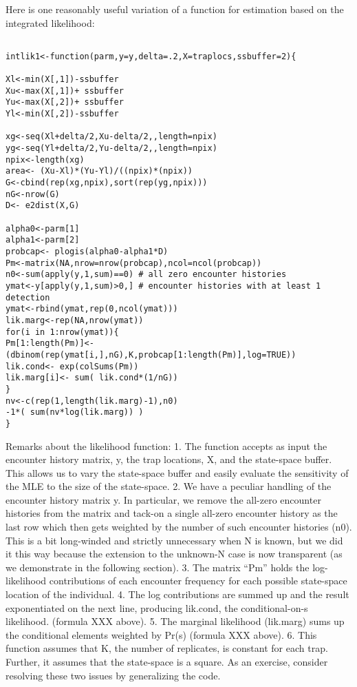 Here is one reasonably useful variation of a function for estimation
based on the integrated likelihood:

\begin{verbatim}

intlik1<-function(parm,y=y,delta=.2,X=traplocs,ssbuffer=2){

Xl<-min(X[,1])-ssbuffer 
Xu<-max(X[,1])+ ssbuffer
Yu<-max(X[,2])+ ssbuffer
Yl<-min(X[,2])-ssbuffer

xg<-seq(Xl+delta/2,Xu-delta/2,,length=npix) 
yg<-seq(Yl+delta/2,Yu-delta/2,,length=npix) 
npix<-length(xg)
area<- (Xu-Xl)*(Yu-Yl)/((npix)*(npix))
G<-cbind(rep(xg,npix),sort(rep(yg,npix)))
nG<-nrow(G)
D<- e2dist(X,G)  

alpha0<-parm[1]
alpha1<-parm[2]
probcap<- plogis(alpha0-alpha1*D)
Pm<-matrix(NA,nrow=nrow(probcap),ncol=ncol(probcap))
n0<-sum(apply(y,1,sum)==0) # all zero encounter histories
ymat<-y[apply(y,1,sum)>0,] # encounter histories with at least 1 detection
ymat<-rbind(ymat,rep(0,ncol(ymat)))
lik.marg<-rep(NA,nrow(ymat))
for(i in 1:nrow(ymat)){
Pm[1:length(Pm)]<- (dbinom(rep(ymat[i,],nG),K,probcap[1:length(Pm)],log=TRUE))
lik.cond<- exp(colSums(Pm))
lik.marg[i]<- sum( lik.cond*(1/nG))  
}
nv<-c(rep(1,length(lik.marg)-1),n0)
-1*( sum(nv*log(lik.marg)) )
}

\end{verbatim}

Remarks about the likelihood function: 1. The function accepts as
input the encounter history matrix, y, the trap locations, X, and the
state-space buffer. This allows us to vary the state-space buffer and
easily evaluate the sensitivity of the MLE to the size of the
state-space. 2. We have a peculiar handling of the encounter history
matrix y. In particular, we remove the all-zero encounter histories
from the matrix and tack-on a single all-zero encounter history as the
last row which then gets weighted by the number of such encounter
histories (n0). This is a bit long-winded and strictly unnecessary
when N is known, but we did it this way because the extension to the
unknown-N case is now transparent (as we demonstrate in the following
section). 3. The matrix “Pm” holds the log-likelihood contributions of
each encounter frequency for each possible state-space location of the
individual. 4. The log contributions are summed up and the result
exponentiated on the next line, producing lik.cond, the
conditional-on-s likelihood. (formula XXX above). 5. The marginal
likelihood (lik.marg) sums up the conditional elements weighted by
Pr(s) (formula XXX above). 6. This function assumes that K, the number
of replicates, is constant for each trap. Further, it assumes that the
state-space is a square. As an exercise, consider resolving these two
issues by generalizing the code.

